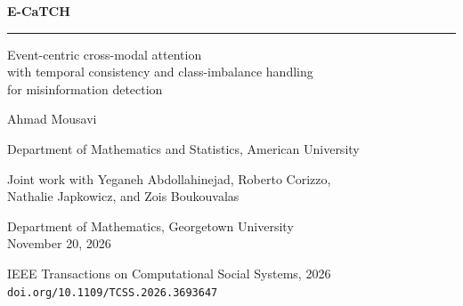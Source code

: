 \begin{frame}[plain]
  \color{white}
  \vspace*{0.22cm}
  \begin{center}
  {\fontsize{24}{28}\selectfont\bfseries E-CaTCH\par}
  \vspace{0.2cm}
  {\color{rule}\rule{3.4cm}{1.6pt}\par}
  \vspace{0.32cm}
  {\large
    Event-centric cross-modal attention\\[0.14em]
    with temporal consistency and class-imbalance handling\\[0.14em]
    for misinformation detection\par}
  \vspace{0.32cm}
  Ahmad Mousavi\\[0.12em]
  {\normalsize Department of Mathematics and Statistics, American University\par}
  \vspace{0.22cm}
  {\small
    Joint work with Yeganeh Abdollahinejad,
    Roberto Corizzo,\\
    Nathalie Japkowicz, and Zois Boukouvalas\par}
  \vspace{0.26cm}
  {\color{rule}
    Department of Mathematics, Georgetown University\\[0.1em]
    November 20, 2026\par}
  \vspace{0.18cm}
  {\footnotesize
    IEEE Transactions on Computational Social Systems, 2026\\
    \texttt{doi.org/10.1109/TCSS.2026.3693647}\par}
  \end{center}
\end{frame}

